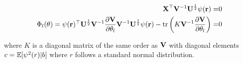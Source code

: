 \begin{align}
\label{eq:rml_beta}
\mathbf{X}^\top\mathbf{V}^{-1} \mathbf{U}^{\frac{1}{2}} \psi(\mathbf{r}) =& 0 \\
\label{eq:rml_theta}
\Phi_l(\theta) = \psi(\mathbf{r})^\top\mathbf{U}^{\frac{1}{2}}\mathbf{V}^{-1}
\frac{\partial\mathbf{V}}{\partial\theta_l}
\mathbf{V}^{-1}\mathbf{U}^{\frac{1}{2}} \psi(\mathbf{r}) - \operatorname{tr}\left(K\mathbf{V}^{-1}\frac{\partial\mathbf{V}}{\partial\theta_l}\right) =& 0 
\end{align}

where $K$ is a diagonal matrix of the same order as $\mathbf{V}$ with
diagonal elements $c = \mathbb{E}[\psi^2(r)|b]$ where $r$ follows a
standard normal distribution.
